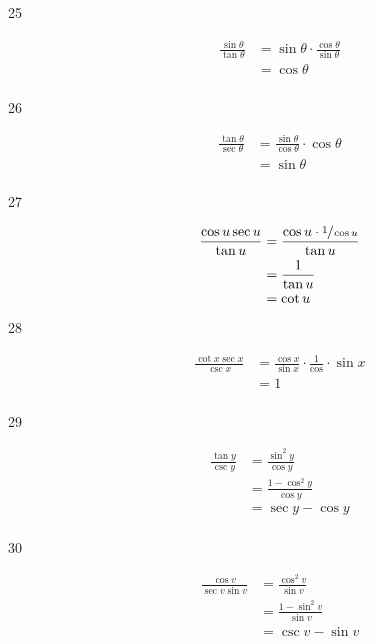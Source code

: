 \documentclass{exam}
\begin{document}
\begin{description}
      \item[25] 
        \begin{align*}
          \frac{\sin \theta}{\tan \theta} & = \sin \theta \cdot \frac{\cos \theta}{\sin \theta} \\
                                          & = \cos \theta \\
        \end{align*}

      \item[26] 
        \begin{align*}
          \frac{\tan \theta}{\sec \theta} & = \frac{\sin \theta}{\cos \theta} \cdot \cos \theta \\
                                          & = \sin \theta \\
        \end{align*}

      \item[27] 
        \begin{align*}
          \frac{\cos u \sec u}{\tan u} & = \frac{\cos u \cdot \sfrac{1}{\cos u}}{\tan u} \\
                                       & = \frac{1}{\tan u} \\
                                       & = \cot u \\
        \end{align*}

      \item[28] 
        \begin{align*}
          \frac{\cot x \sec x}{\csc x} & = \frac{\cos x}{\sin x} \cdot \frac{1}{\cos} \cdot \sin x \\
                                       & = 1 \\
        \end{align*}

      \item[29] 
        \begin{align*}
          \frac{\tan y}{\csc y} & = \frac{\sin^2 y}{\cos y} \\
                                & = \frac{1 - \cos^2 y}{\cos y} \\
                                & = \sec y - \cos y \\
        \end{align*}

      \item[30] 
        \begin{align*}
          \frac{\cos v}{\sec v \sin v} & = \frac{\cos^2 v}{\sin v} \\
                                       & = \frac{1 - \sin^2 v}{\sin v} \\
                                       & = \csc v - \sin v \\
        \end{align*}


\end{description}
\end{document}
